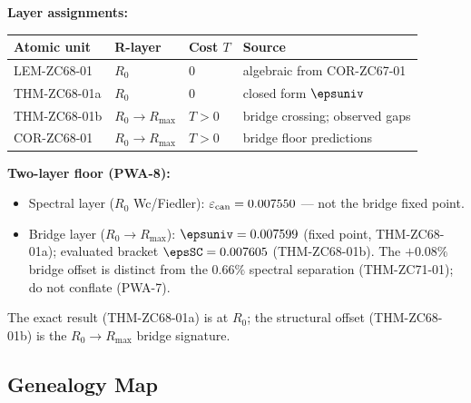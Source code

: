 \documentclass[12pt, a4paper]{article}
\renewcommand{\epscan}{\varepsilon_{\rm can}}
\begin{document}
\begin{layerbox}[title={R-Layer Assignments for ZC68}]

\textbf{Layer assignments:}

{\small\renewcommand{\arraystretch}{1.25}
\begin{center}
\begin{tabular}{@{}llll@{}}
\toprule
Atomic unit & R-layer & Cost $T$ & Source \\
\midrule
LEM-ZC68-01    & $R_0$              & $0$ & algebraic from COR-ZC67-01 \\
THM-ZC68-01a   & $R_0$              & $0$ & closed form $\epsuniv$ \\
THM-ZC68-01b   & $R_0{\to}R_{\max}$ & $T>0$ & bridge crossing; observed gaps \\
COR-ZC68-01    & $R_0{\to}R_{\max}$ & $T>0$ & bridge floor predictions \\
\bottomrule
\end{tabular}
\end{center}}

\textbf{Two-layer floor (PWA-8):}
\begin{itemize}[leftmargin=2em, noitemsep]
  \item Spectral layer ($R_0$ Wc/Fiedler): $\epscan=0.007550$ ---
    not the bridge fixed point.
  \item Bridge layer ($R_0{\to}R_{\max}$): $\epsuniv=0.007599$ (fixed
    point, THM-ZC68-01a); evaluated bracket $\epsSC=0.007605$
    (THM-ZC68-01b). The $+0.08\%$ bridge offset is distinct from the
    $0.66\%$ spectral separation (THM-ZC71-01); do not conflate (PWA-7).
\end{itemize}

The exact result (THM-ZC68-01a) is at $R_0$; the structural offset
(THM-ZC68-01b) is the $R_0\to R_{\max}$ bridge signature.
\end{layerbox}

\subsection{Genealogy Map}
\label{sec:genealogy}
\end{document}
